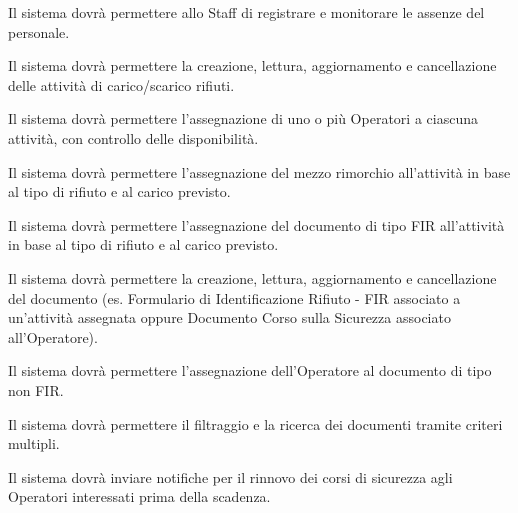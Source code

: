 \documentclass[a4paper]{report}
\begin{document}


Il sistema dovrà permettere allo Staff di registrare e monitorare le assenze del personale.



Il sistema dovrà permettere la creazione, lettura, aggiornamento e cancellazione delle attività di carico/scarico rifiuti.


Il sistema dovrà permettere l'assegnazione di uno o più Operatori a ciascuna attività, con controllo delle disponibilità.


Il sistema dovrà permettere l'assegnazione del mezzo rimorchio all'attività in base al tipo di rifiuto e al carico previsto.


Il sistema dovrà permettere l'assegnazione del documento di tipo FIR all'attività in base al tipo di rifiuto e al carico previsto.



Il sistema dovrà permettere la creazione, lettura, aggiornamento e cancellazione del documento (es. Formulario di Identificazione Rifiuto - FIR associato a un'attività assegnata oppure Documento Corso sulla Sicurezza associato all'Operatore).


Il sistema dovrà permettere l’assegnazione dell’Operatore al documento di tipo non FIR. 


Il sistema dovrà permettere il filtraggio e la ricerca dei documenti tramite criteri multipli.


Il sistema dovrà inviare notifiche per il rinnovo dei corsi di sicurezza agli Operatori interessati prima della scadenza.

\end{document}
